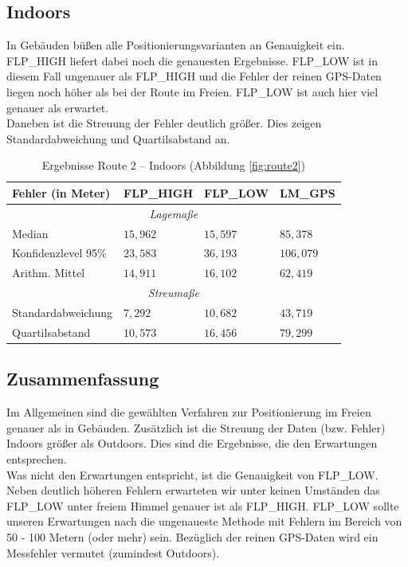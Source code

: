 \subsection{Indoors}

In Gebäuden büßen alle Positionierungsvarianten an Genauigkeit ein. FLP\_HIGH liefert dabei noch die genauesten Ergebnisse. FLP\_LOW ist in diesem Fall ungenauer als FLP\_HIGH und die Fehler der reinen GPS-Daten liegen noch höher als bei der Route im Freien. FLP\_LOW ist auch hier viel genauer als erwartet. \\

Daneben ist die Streuung der Fehler deutlich größer. Dies zeigen Standardabweichung und Quartilsabstand an.

\begin{table}[h!]
	\centering
	\caption{Ergebnisse Route 2 -- Indoors (Abbildung \ref{fig:route2})}
	\begin{tabular}{|l|l|l|l|}
	\hline
	Fehler (in Meter) & FLP\_HIGH & FLP\_LOW & LM\_GPS \\
	\hline
	\multicolumn{4}{|c|}{\textit{Lagemaße}}\\
	\hline
	Median & $15,962$ & $15,597$ & $85,378$ \\
	Konfidenzlevel 95\% & $23,583$ & $36,193$ & $106,079$ \\
	Arithm. Mittel & $14,911$ & $16,102$ & $62,419$ \\
	\hline
	\multicolumn{4}{|c|}{\textit{Streumaße}}\\
	\hline
	Standardabweichung & $7,292$ & $10,682$ & $43,719$ \\
	Quartilsabstand & $10,573$ & $16,456$ & $79,299$ \\
	\hline
	\end{tabular}
\end{table}

\subsection{Zusammenfassung}

Im Allgemeinen sind die gewählten Verfahren zur Positionierung im Freien genauer als in Gebäuden. Zusätzlich ist die Streuung der Daten (bzw. Fehler) Indoors größer als Outdoors. Dies sind die Ergebnisse, die den Erwartungen entsprechen. \\

Was nicht den Erwartungen entspricht, ist die Genauigkeit von FLP\_LOW. Neben deutlich höheren Fehlern erwarteten wir unter keinen Umständen das FLP\_LOW unter freiem Himmel genauer ist als FLP\_HIGH. FLP\_LOW sollte unseren Erwartungen nach die ungenaueste Methode mit Fehlern im Bereich von 50 - 100 Metern (oder mehr) sein. Bezüglich der reinen GPS-Daten wird ein Messfehler vermutet (zumindest Outdoors).

